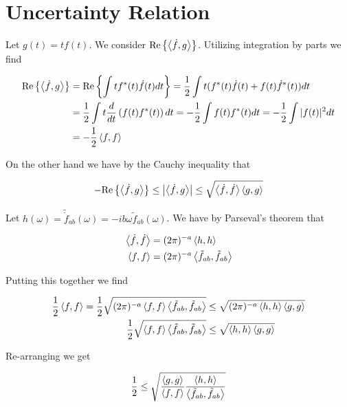 \documentclass[12pt]{article}
\begin{document}
\section{Uncertainty Relation}

Let $g(t) = tf(t)$. We consider $\text{Re}\left\{\Braket{\dot{f},g} \right\}$. Utilizing integration by parts we find

\begin{align}
\text{Re}\left\{\Braket{\dot{f},g} \right\} &= \text{Re}\left\{\int t f^*(t)\dot{f}(t)dt\right\} = \frac{1}{2}\int t(f^*(t)\dot{f}(t) + f(t)\dot{f}^*(t)) dt\\
&= \frac{1}{2}\int t \frac{d}{dt}\left(f(t)f^*(t) \right) dt = -\frac{1}{2}\int f(t)f^*(t) dt = -\frac{1}{2}\int |f(t)|^2 dt\\
&= -\frac{1}{2}\Braket{f,f}
\end{align}

On the other hand we have by the Cauchy inequality that

\begin{align}
-\text{Re}\left\{\Braket{\dot{f},g} \right\} \le \left\lvert \Braket{\dot{f},g} \right\rvert \le \sqrt{\Braket{\dot{f},\dot{f}}\Braket{g,g}}
\end{align}

Let $h(\omega) = \tilde{\dot{f}}_{ab}(\omega) =  -ib\omega \tilde{f}_{ab}(\omega)$. We have by Parseval's theorem that

\begin{align}
\Braket{\dot{f},\dot{f}} &= (2\pi)^{-a}\Braket{h,h}\\
\Braket{f,f} &= (2\pi)^{-a}\Braket{\tilde{f}_{ab},\tilde{f}_{ab}}
\end{align}

Putting this together we find

\begin{align}
\frac{1}{2}\Braket{f,f} = \frac{1}{2}\sqrt{(2\pi)^{-a}\Braket{f,f}\Braket{\tilde{f}_{ab},\tilde{f}_{ab}}} &\le \sqrt{(2\pi)^{-a} \Braket{h,h}\Braket{g,g}}\\
\frac{1}{2}\sqrt{\Braket{f,f}\Braket{\tilde{f}_{ab},\tilde{f}_{ab}}} &\le \sqrt{\Braket{h,h}\Braket{g,g}}
\end{align}

Re-arranging we get

\begin{align}
\frac{1}{2} \le \sqrt{\frac{\Braket{g,g}}{\Braket{f,f}} \frac{\Braket{h,h}}{\Braket{\tilde{f}_{ab},\tilde{f}_{ab}}}}
\end{align}
\end{document}
